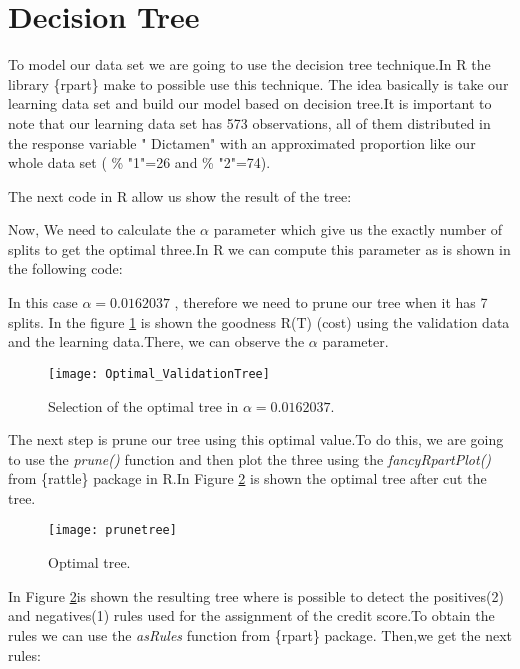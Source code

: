 \documentclass[a4paper, 10pt]{article}
\begin{document}
\section{Decision Tree}

To model our data set we are going to use the decision tree technique.In R the library \{rpart\} make to possible use this technique. The idea basically is take our learning data set and build our model based on decision tree.It is important to note that our learning data set has 573 observations, all of them distributed in the response variable " Dictamen" with an approximated proportion like our whole data set ( \% "1"=26 and \% "2"=74).

The next code in R allow us show the result of the tree:



Now, We need to calculate the $\alpha$ parameter which give us the exactly number of splits to get the optimal three.In R we can compute this parameter as is shown in the following code:



In this case $ \alpha= 0.0162037 $ , therefore we need to prune our tree when it has 7 splits. In the figure \ref{optimal} is shown the goodness R(T) (cost) using the validation data and the learning data.There, we can observe the $\alpha$ parameter.

 	\begin{figure}[H]
 	\centering 
 	\texttt{[image: Optimal\_ValidationTree]}
 		\caption{\label{optimal}Selection of the optimal tree in $\alpha=0.0162037$.}
  	\end{figure}


The next step is prune our tree using this optimal value.To do this, we are going to use the \textit {prune()} function and then plot the three using the \textit {fancyRpartPlot()} from \{rattle\} package in R.In Figure \ref{optimaltree} is shown the optimal tree after cut the tree.

	\begin{figure}[H]
		\centering 
		\texttt{[image: prunetree]}
		\caption{\label{optimaltree}Optimal tree.}
	\end{figure}

In Figure \ref{optimaltree}is shown the resulting tree where is possible to detect the positives(2) and negatives(1) rules used for the assignment of the credit score.To obtain the rules we can use the \textit {asRules} function from \{rpart\} package. Then,we get the next rules:\\
\end{document}
